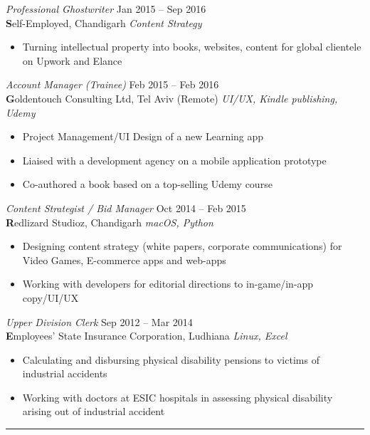 \documentclass[margin, 10pt]{res} %
\begin{document}
\begin{resume}
{\sl Professional Ghostwriter} \hfill Jan 2015 – Sep 2016 \\
\textbf Self-Employed, Chandigarh \hfill {\scriptsize \it Content Strategy}
\begin{itemize}\smallskip\smallskip
\item Turning intellectual property into books, websites, content for global clientele on Upwork and Elance
\end{itemize}

{\sl Account Manager (Trainee)} \hfill Feb 2015 – Feb 2016 \\
\textbf Goldentouch Consulting Ltd, Tel Aviv (Remote) \hfill {\scriptsize \it UI/UX, Kindle publishing, Udemy} 
\begin{itemize}\smallskip\smallskip
\item Project Management/UI Design of a new Learning app
\item Liaised with a development agency on a mobile application prototype
\item Co-authored a book based on a top-selling Udemy course
\end{itemize}

{\sl Content Strategist / Bid Manager} \hfill Oct 2014 – Feb 2015 \\
\textbf Redlizard Studioz, Chandigarh \hfill {\scriptsize \it macOS, Python}
\begin{itemize}\smallskip\smallskip
\item Designing content strategy (white papers, corporate communications) for Video Games, E-commerce apps and web-apps
\item Working with developers for editorial directions to in-game/in-app copy/UI/UX
\end{itemize}

{\sl Upper Division Clerk} \hfill Sep 2012 – Mar 2014 \\
\textbf Employees' State Insurance Corporation, Ludhiana \hfill {\scriptsize \it Linux, Excel}
\begin{itemize}\smallskip\smallskip
\item Calculating and disbursing physical disability pensions to victims of industrial accidents
\item Working with doctors at ESIC hospitals in assessing physical disability arising out of industrial accident 
\end{itemize} 

\par\noindent\rule{\textwidth}{0.1pt}


\end{resume}
\end{document}
